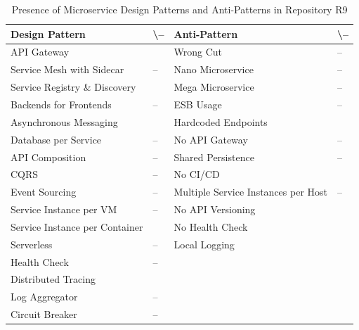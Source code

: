 \documentclass{Configuration_Files/PoliMi3i_thesis}
\newcommand{\cmark}{\ding{51}}%
\begin{document}
\begin{table}[H]
\centering 
    \begin{tabular}{ 
  | >{\centering\arraybackslash} m{16em} 
  | >{\centering\arraybackslash} m{2.2em} 
  | >{\centering\arraybackslash} m{16em} 
  | >{\centering\arraybackslash} m{2.2em} | }
    \hline
    \rowcolor{bluepoli!40}
    \textbf{Design Pattern} & \cmark \textbackslash – & \textbf{Anti-Pattern} & \cmark \textbackslash – \T\B \\
    \hline \hline
    API Gateway & \cmark & Wrong Cut & – \T\B\\
    \hline
    \rowcolor{bluepoli!10}
    Service Mesh with Sidecar & – & Nano Microservice & – \T\B \\
    \hline
    Service Registry \& Discovery & \cmark & Mega Microservice & – \T\B \\
    \hline
    \rowcolor{bluepoli!10}
    Backends for Frontends & – & ESB Usage & – \T\B \\
    \hline
    Asynchronous Messaging & \cmark & Hardcoded Endpoints & \cmark \T\B \\
    \hline
    \rowcolor{bluepoli!10}
    Database per Service & – & No API Gateway & – \T\B \\
    \hline
    API Composition & – & Shared Persistence & – \T\B \\
    \hline
    \rowcolor{bluepoli!10}
    CQRS & – & No CI/CD & \cmark \T\B \\
    \hline
    Event Sourcing & – & Multiple Service Instances per Host & – \T\B \\
    \hline
    \rowcolor{bluepoli!10}
    Service Instance per VM & – & No API Versioning & \cmark \T\B \\
    \hline
    Service Instance per Container & \cmark & No Health Check & \cmark \T\B \\
    \hline
    \rowcolor{bluepoli!10}
    Serverless & – & Local Logging & \cmark \T\B \\
    \hline
    Health Check & – &  & \T\B \\
    \hline
    \rowcolor{bluepoli!10}
    Distributed Tracing & \cmark & & \T\B \\
    \hline
    Log Aggregator & – &  & \T\B \\
    \hline
    \rowcolor{bluepoli!10}
    Circuit Breaker & – &  & \T\B \\
    \hline
    \end{tabular}
    \\[10pt]
    \caption{Presence of Microservice Design Patterns and Anti-Patterns in Repository R9}
    \label{table:R9_result}
\end{table}
\end{document}
